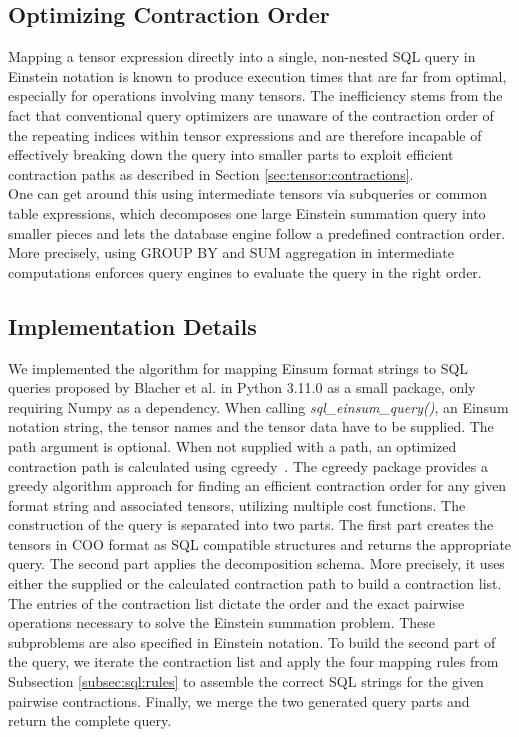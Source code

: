\subsection{Optimizing Contraction Order}
Mapping a tensor expression directly into a single, non-nested SQL query in Einstein
notation is known to produce execution times that are far from optimal, especially for operations
involving many tensors. The inefficiency stems from the fact that conventional query optimizers
are unaware of the contraction order of the repeating indices within tensor expressions and are
therefore incapable of effectively breaking down the query into smaller parts to exploit efficient
contraction paths as described in Section \ref{sec:tensor:contractions}.\\
One can get around this using intermediate tensors via subqueries or common table expressions,
which decomposes one large Einstein summation query into smaller pieces and lets the database
engine follow a predefined contraction order. More precisely, using GROUP BY and SUM
aggregation in intermediate computations enforces query engines to evaluate the query in the
right order.

\subsection{Implementation Details}
We implemented the algorithm for mapping Einsum format strings to SQL queries proposed by Blacher
et al. in Python 3.11.0 as a small package, only requiring Numpy as a dependency. When
calling \textit{sql\_einsum\_query()}, an Einsum notation string, the tensor names and the tensor
data have to be supplied. The path argument is optional. When not supplied with a path, an
optimized contraction path is calculated using cgreedy~\cite{cgreedy}. The cgreedy package
provides a greedy algorithm approach for finding an efficient contraction order for any given
format string and associated tensors, utilizing multiple cost functions. The construction of the
query is separated into two parts. The first part creates the tensors in COO format as SQL
compatible structures and returns the appropriate query. The second part applies the decomposition
schema. More precisely, it uses either the supplied or the calculated contraction path to build a
contraction list. The entries of the contraction list dictate the order and the exact pairwise
operations necessary to solve the Einstein summation problem. These subproblems are also specified
in Einstein notation. To build the second part of the query, we iterate the contraction list and
apply the four mapping rules from Subsection \ref{subsec:sql:rules} to assemble the correct SQL
strings for the given pairwise contractions. Finally, we merge the two generated query parts and
return the complete query.

